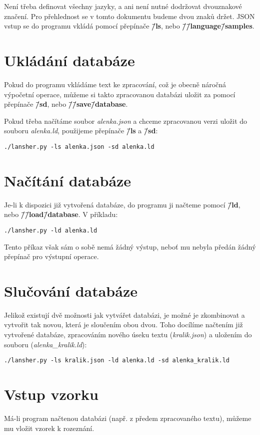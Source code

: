 \documentclass[11pt]{article}
\begin{document}
Není třeba definovat všechny jazyky, a ani není nutné dodržovat dvouznakové značení. Pro přehlednost se v tomto dokumentu budeme dvou znaků držet. JSON vstup se do programu vkládá pomocí přepínače \textbf{\=/ls}, nebo \textbf{\=/\=/language\=/samples}.

\section{Ukládání databáze}
Pokud do programu vkládáme text ke zpracování, což je obecně náročná výpočetní operace, můžeme si takto zpracovanou databázi uložit za pomocí přepínače \textbf{\=/sd}, nebo \textbf{\=/\=/save\=/database}.

Pokud třeba načítáme soubor \textit{alenka.json} a chceme zpracovanou verzi uložit do souboru \textit{alenka.ld}, použijeme přepínače \textbf{\=/ls} a \textbf{\=/sd}:
\begin{lstlisting}
./lansher.py -ls alenka.json -sd alenka.ld
\end{lstlisting}

\section{Načítání databáze}
Je-li k dispozici již vytvořená databáze, do programu ji načteme pomocí \textbf{\=/ld}, nebo \textbf{\=/\=/load\=/database}. V příkladu:
\begin{lstlisting}
./lansher.py -ld alenka.ld
\end{lstlisting}

Tento příkaz však sám o sobě nemá žádný výstup, neboť mu nebyla předán žádný přepínač pro výstupní operace.

\section{Slučování databáze}
Jelikož existují dvě možnosti jak vytvářet databázi, je možné je zkombinovat a vytvořit tak novou, která je sloučením obou dvou. Toho docílíme načtením již vytvořené databáze, zpracováním nového úseku textu (\textit{kralik.json}) a uložením do souboru (\textit{alenka\_kralik.ld}):

\begin{lstlisting}
./lansher.py -ls kralik.json -ld alenka.ld -sd alenka_kralik.ld
\end{lstlisting}


\section{Vstup vzorku}
Má-li program načtenou databázi (např. z předem zpracovaného textu), můžeme mu vložit vzorek k rozeznání.
\end{document}
